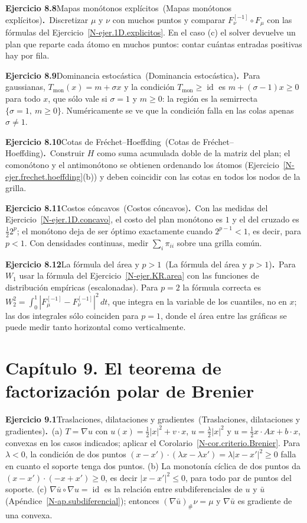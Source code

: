 \documentclass[11pt,a4paper]{amsart}
\newcommand{\id}{\operatorname{id}}
\theoremstyle{remark}
\theoremstyle{definition}
\numberwithin{subsection}{section}
\numberwithin{equation}{section}
\newcommand{\ejlabel}[2]{\par\medskip\noindent\textbf{Ejercicio #1}\ifx\relax#2\relax\else\ (#2)\fi\textbf{.}\ }
\begin{document}
\ejlabel{8.8}{Mapas monótonos explícitos}Discretizar $\mu$ y $\nu$ con muchos puntos y comparar $F_\nu^{[-1]}\circ F_\mu$ con las fórmulas del Ejercicio~\ref{N-ejer.1D.explicitos}. En el caso (c) el solver devuelve un plan que reparte cada átomo en muchos puntos: contar cuántas entradas positivas hay por fila.

\ejlabel{8.9}{Dominancia estocástica}Para gaussianas, $T_\text{mon}(x)=m+\sigma x$ y la condición $T_\text{mon}\ge\id$ es $m+(\sigma-1)x\ge0$ para todo $x$, que sólo vale si $\sigma=1$ y $m\ge0$: la región es la semirrecta $\{\sigma=1,\ m\ge0\}$. Numéricamente se ve que la condición falla en las colas apenas $\sigma\ne1$.

\ejlabel{8.10}{Cotas de Fréchet--Hoeffding}Construir $H$ como suma acumulada doble de la matriz del plan; el comonótono y el antimonótono se obtienen ordenando los átomos (Ejercicio~\ref{N-ejer.frechet.hoeffding}(b)) y deben coincidir con las cotas en todos los nodos de la grilla.

\ejlabel{8.11}{Costos cóncavos}Con las medidas del Ejercicio~\ref{N-ejer.1D.concavo}, el costo del plan monótono es $1$ y el del cruzado es $\frac12 2^p$; el monótono deja de ser óptimo exactamente cuando $2^{p-1}<1$, es decir, para $p<1$. Con densidades continuas, medir $\sum_i\pi_{ii}$ sobre una grilla común.

\ejlabel{8.12}{La fórmula del área y $p>1$}Para $W_1$ usar la fórmula del Ejercicio~\ref{N-ejer.KR.area} con las funciones de distribución empíricas (escalonadas). Para $p=2$ la fórmula correcta es $W_2^2=\int_0^1|F_\mu^{[-1]}-F_\nu^{[-1]}|^2\,dt$, que integra en la variable de los cuantiles, no en $x$; las dos integrales sólo coinciden para $p=1$, donde el área entre las gráficas se puede medir tanto horizontal como verticalmente.

\section*{Capítulo 9. El teorema de factorización polar de Brenier}
\ejlabel{9.1}{Traslaciones, dilataciones y gradientes}(a) $T=\nabla u$ con $u(x)=\frac12|x|^2+v\cdot x$, $u=\frac\lambda2|x|^2$ y $u=\frac12x\cdot Ax+b\cdot x$, convexas en los casos indicados; aplicar el Corolario~\ref{N-cor.criterio.Brenier}. Para $\lambda<0$, la condición de dos puntos $(x-x')\cdot(\lambda x-\lambda x')=\lambda|x-x'|^2\ge0$ falla en cuanto el soporte tenga dos puntos. (b) La monotonía cíclica de dos puntos da $(x-x')\cdot(-x+x')\ge0$, es decir $|x-x'|^2\le0$, para todo par de puntos del soporte. (c) $\nabla\bar u\circ\nabla u=\id$ es la relación entre subdiferenciales de $u$ y $\bar u$ (Apéndice~\ref{N-ap.subdiferencial}); entonces $(\nabla\bar u)_\#\nu=\mu$ y $\nabla\bar u$ es gradiente de una convexa.
\end{document}
